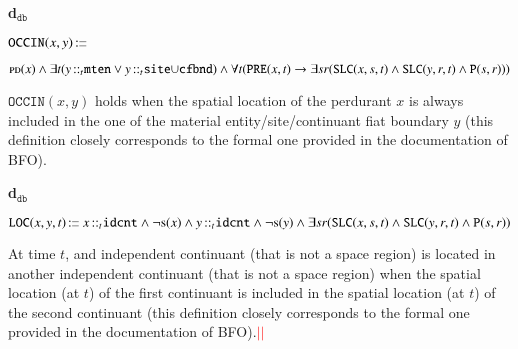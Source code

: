 \documentclass[ao]{iosart2x}
\newcommand{\nb}[1]{\textcolor{red}{$|$}\marginpar{\hspace*{-0cm}\parbox{20mm}{\scriptsize\raggedright\textcolor{red}{#1}}}}
\newcommand{\bfoDefLabel}{\textrm{d$_\texttt{b}$}}
\newcommand{\dbDefLabel}{\textrm{d$_\texttt{db}$}}
\newcounter{cntdbdf}
\newcommand{\dbdf}[1]{\refstepcounter{cntdbdf}\begin{small}{\bf \dbDefLabel\thecntdbdf\label{#1}}\end{small}}
\newcommand{\refbfodf}[1]{({\bfoDefLabel}\ref{#1})}
\newcommand{\pr}[1]{\mathtt{#1}}
\newcommand{\cn}[1]{\mathtt{#1}}
\newcommand\textequal{%
 \rule[.08ex]{5pt}{0.35pt}\llap{\rule[.78ex]{5pt}{0.35pt}}}
\newcommand{\sdef}{{\hspace{1.5pt}:\hspace{-2.5pt}\textequal\hspace{3pt}}}
\newcommand{\dolce}{{\textsc{dolce}}}
\newcommand {\PDdcat} {\textsc{pd}}
\newcommand {\Sdcat} {\textsc{s}}
\newcommand {\Pd} {\ensuremath{\pr{P}}}
\newcommand {\PREd} {\ensuremath{\pr{PRE}}}
\newcommand {\SLCd} {\ensuremath{\pr{SLC}}}
\newcommand{\idcntbcat}{\cn{idcnt}}
\newcommand{\mtenbcat}{\cn{mten}}
\newcommand{\sitebcat}{\cn{site}}
\newcommand{\cfbndbcat}{\cn{cfbnd}}
\newcommand{\bfoiof}[1]{{\,::_{#1\:\!}}}
\newcommand{\bfooccurs}{\pr{OCCIN}}
\newcommand{\bfolocated}{\pr{LOC}}
\begin{document}
\item[\dbdf{d2b_occurs}] $\bfooccurs(x,y) \sdef $\parbox[t]{\textwidth}{$\PDdcat(x) \land \exists t(y \bfoiof{t} \mtenbcat \lor y \bfoiof{t} \sitebcat{\cup}\cfbndbcat) \land \\ 
\forall t(\PREd(x,t) \to \exists sr(\SLCd(x,s,t) \land \SLCd(y,r,t) \land \Pd(s,r)))$}

\vspace{1pt}
$\bfooccurs(x,y)$ holds when the spatial location of the perdurant $x$ is always included in the one of the material entity/site/continuant fiat boundary $y$ (this definition closely corresponds to the formal one provided in the documentation of BFO).


\item[\dbdf{d2b_located}] $\bfolocated(x,y,t) \sdef x \bfoiof{t} \idcntbcat \land \neg\Sdcat(x) \land y \bfoiof{t} \idcntbcat \land \neg\Sdcat(y) \land
\exists sr(\SLCd(x,s,t) \land \SLCd(y,r,t) \land \Pd(s,r))$

\vspace{1pt}
At time $t$, and independent continuant (that is not a space region) is located in another independent continuant (that is not a space region) when the spatial location (at $t$) of the first continuant is included in the spatial location (at $t$) of the second continuant (this definition closely corresponds to the formal one provided in the documentation of BFO).\nb{SB: sopra diciamo che la parte formale ha priorità sull'altra documentazione, verificare che questo caso non contraddica quella affermazione}\nb{CM: ho aggiustato mettendo formal, infatti nella doc. fi BFO queste ultime due nozioni sono definite formalmente come sopra}

%
\end{document}
